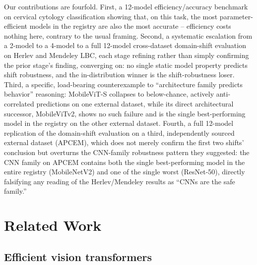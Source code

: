 \documentclass[runningheads]{llncs}
\begin{document}
Our contributions are fourfold. First, a 12-model efficiency/accuracy
benchmark on cervical cytology classification showing that, on this task,
the most parameter-efficient models in the registry are also the most
accurate -- efficiency costs nothing here, contrary to the usual framing.
Second, a systematic escalation from a 2-model to a 4-model to a full
12-model cross-dataset domain-shift evaluation on Herlev and Mendeley LBC,
each stage refining rather than simply confirming the prior stage's
finding, converging on: no single static model property predicts shift
robustness, and the in-distribution winner is the shift-robustness loser.
Third, a specific, load-bearing counterexample to ``architecture family
predicts behavior'' reasoning: MobileViT-S collapses to below-chance,
actively anti-correlated predictions on one external dataset, while its
direct architectural successor, MobileViTv2, shows no such failure and is
the single best-performing model in the registry on the other external
dataset. Fourth, a full 12-model replication of the domain-shift
evaluation on a third, independently sourced external dataset (APCEM),
which does not merely confirm the first two shifts' conclusion but
overturns the CNN-family robustness pattern they suggested: the CNN family
on APCEM contains both the single best-performing model in the entire
registry (MobileNetV2) and one of the single worst (ResNet-50), directly
falsifying any reading of the Herlev/Mendeley results as ``CNNs are the
safe family.''

\section{Related Work}

\subsection{Efficient vision transformers}
\end{document}
